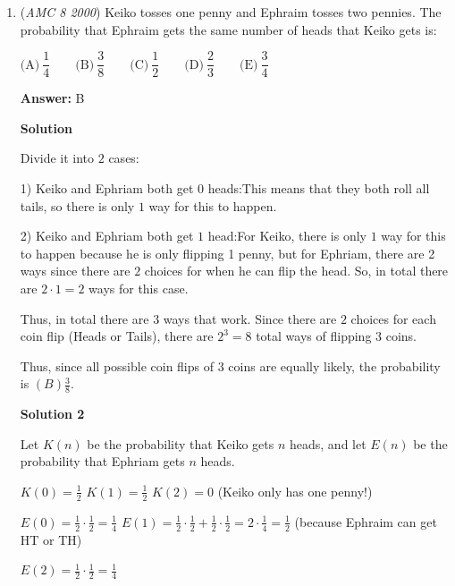 \begin{enumerate}
            \begin{itemize}
        \item It might seem that this solution takes time, but in reality, it can be done very quickly, given ones desire to solve a problem quickly
            \end{itemize}
            


	\item (\textit{AMC 8 2000}) Keiko tosses one penny and Ephraim tosses two pennies. The probability that Ephraim gets the same number of heads that Keiko gets is:


 $\text{(A)}\ \dfrac{1}{4} \qquad \text{(B)}\ \dfrac{3}{8} \qquad \text{(C)}\ \dfrac{1}{2} \qquad \text{(D)}\ \dfrac{2}{3} \qquad \text{(E)}\ \dfrac{3}{4}$

 \textbf{Answer: }B



\textbf{Solution}

Divide it into $2$ cases:

 1) Keiko and Ephriam both get $0$ heads:This means that they both roll all tails, so there is only $1$ way for this to happen.

 2) Keiko and Ephriam both get $1$ head:For Keiko, there is only $1$ way for this to happen because he is only flipping 1 penny, but for Ephriam, there are 2 ways since there are $2$ choices for when he can flip the head. So, in total there are $2 \cdot 1 = 2$ ways for this case.

 Thus, in total there are $3$ ways that work. Since there are $2$ choices for each coin flip (Heads or Tails), there are $2^3 = 8$ total ways of flipping 3 coins.

 Thus, since all possible coin flips of 3 coins are equally likely, the probability is $\boxed{(B) \frac38}$.

 



\textbf{Solution 2}

Let $K(n)$ be the probability that Keiko gets $n$ heads, and let $E(n)$ be the probability that Ephriam gets $n$ heads.

 $K(0) = \frac{1}{2}$
$K(1) = \frac{1}{2}$
$K(2) = 0$  (Keiko only has one penny!)

 $E(0) = \frac{1}{2}\cdot\frac{1}{2} = \frac{1}{4}$
$E(1) = \frac{1}{2}\cdot\frac{1}{2} + \frac{1}{2}\cdot\frac{1}{2} = 2\cdot\frac{1}{4} = \frac{1}{2}$  (because Ephraim can get HT or TH)

 $E(2) = \frac{1}{2}\cdot\frac{1}{2} = \frac{1}{4}$


\end{enumerate}
